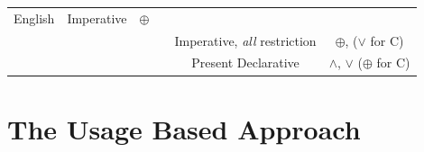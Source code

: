 \documentclass[oneside]{report}
\theoremstyle{definition}
\theoremstyle{definition}
\theoremstyle{definition}
\theoremstyle{remark}
\begin{document}
\begin{longtable}[]{@{}lcclcc@{}}
\begin{minipage}[t]{0.06\columnwidth}
English\strut
\end{minipage} & \begin{minipage}[t]{0.31\columnwidth}\centering\strut
Imperative\strut
\end{minipage} & \begin{minipage}[t]{0.12\columnwidth}\centering\strut
\(\oplus\)\strut
\end{minipage}\tabularnewline
\begin{minipage}[t]{0.17\columnwidth}\raggedright\strut
\strut
\end{minipage} & \begin{minipage}[t]{0.09\columnwidth}\centering\strut
\strut
\end{minipage} & \begin{minipage}[t]{0.09\columnwidth}\centering\strut
\strut
\end{minipage} & \begin{minipage}[t]{0.06\columnwidth}\raggedright\strut
\strut
\end{minipage} & \begin{minipage}[t]{0.31\columnwidth}\centering\strut
Imperative, \emph{all} restriction\strut
\end{minipage} & \begin{minipage}[t]{0.12\columnwidth}\centering\strut
\(\oplus\), (\(\lor\) for C)\strut
\end{minipage}\tabularnewline
\begin{minipage}[t]{0.17\columnwidth}\raggedright\strut
\strut
\end{minipage} & \begin{minipage}[t]{0.09\columnwidth}\centering\strut
\strut
\end{minipage} & \begin{minipage}[t]{0.09\columnwidth}\centering\strut
\strut
\end{minipage} & \begin{minipage}[t]{0.06\columnwidth}\raggedright\strut
\strut
\end{minipage} & \begin{minipage}[t]{0.31\columnwidth}\centering\strut
Present Declarative\strut
\end{minipage} & \begin{minipage}[t]{0.12\columnwidth}\centering\strut
\(\land\), \(\lor\) (\(\oplus\) for C)\strut
\end{minipage}\tabularnewline
\bottomrule
\end{longtable}
\section{The Usage Based Approach}\label{the-usage-based-approach}
\end{document}
